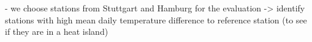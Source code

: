 - we choose stations from Stuttgart and Hamburg for the evaluation
-> identify stations with high mean daily temperature difference to reference station (to see if they are in a heat island)










